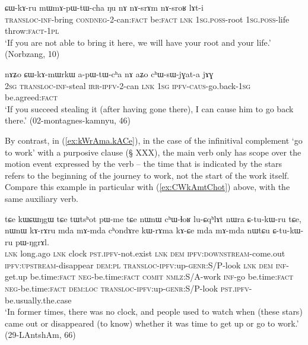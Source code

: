 \begin{exe}
\ex \label{ex:CWkAru}
\gll ɕɯ-kɤ-ru mɯ\redp{}mɤ-pɯ-tɯ-cha ŋu nɤ nɤ-srɤm nɤ-sroʁ lɤt-i \\
\textsc{transloc}-\textsc{inf}-bring \textsc{cond}\redp{}\textsc{neg}-2-can:\textsc{fact} be:\textsc{fact} \textsc{lnk} \textsc{1sg.poss}-root \textsc{1sg.poss}-life throw:\textsc{fact}-\textsc{1pl} \\ 
\glt `If you are not able to bring it here, we will have your root and your life.' (Norbzang, 10)
\end{exe}

\begin{exe}
\ex \label{ex:CWkAmWrkW}
\gll nɤʑo ɕɯ-kɤ-mɯrkɯ a-pɯ-tɯ-cʰa nɤ aʑo cʰɯ-sɯ-jɣat-a jɤɣ \\
\textsc{2sg} \textsc{transloc}-\textsc{inf}-steal \textsc{irr}-\textsc{ipfv}-2-can \textsc{lnk} \textsc{1sg} \textsc{ipfv}-\textsc{caus}-go.back-\textsc{1sg} be.agreed:\textsc{fact} \\
\glt `If you succeed stealing it (after having gone there), I can cause him to go back there.' (02-montagnes-kamnyu, 46)
\end{exe}

 
By contrast, in  (\ref{ex:kWrAma.kACe}), in the case of the infinitival complement  `go to work' with a purposive clause  (§ XXX), the main verb  only has scope over the motion event expressed by the verb  -- the time that is indicated by the stars refers to the beginning of the journey to work, not the start of the work itself. Compare this example in particular with (\ref{ex:CWkAmtChot}) above, with the same auxiliary verb.
 
 \begin{exe}
\ex \label{ex:kWrAma.kACe}
\gll  tɕe kɯɕɯŋgɯ tɕe tɯtsʰot pɯ-me tɕe  nɯnɯ cʰɯ-ɬoʁ lu-ɕqʰlɤt nɯra ɕ-tu-kɯ-ru tɕe, nɯnɯ kɤ-rɤru mda mɤ-mda cʰondɤre kɯ-rɤma kɤ-ɕe mda mɤ-mda nɯtɕu ɕ-tu-kɯ-ru pɯ-ŋgrɤl. \\
 \textsc{lnk} long.ago \textsc{lnk} clock \textsc{pst}.\textsc{ipfv}-not.exist \textsc{lnk} \textsc{dem} \textsc{ipfv}:\textsc{downstream}-come.out \textsc{ipfv}:\textsc{upstream}-disappear \textsc{dem}:\textsc{pl} \textsc{transloc}-\textsc{ipfv}:up-\textsc{genr}:S/P-look \textsc{lnk} \textsc{dem} \textsc{inf}-get.up be.time:\textsc{fact} \textsc{neg}-be.time:\textsc{fact} \textsc{comit} \textsc{nmlz}:S/A-work \textsc{inf}-go be.time:\textsc{fact} \textsc{neg}-be.time:\textsc{fact} \textsc{dem}:\textsc{loc} \textsc{transloc}-\textsc{ipfv}:up-\textsc{genr}:S/P-look \textsc{pst}.\textsc{ipfv}-be.usually.the.case  \\
 \glt  `In former times, there was no clock, and people used to watch when (these stars) came out or disappeared (to know) whether it was time to get up or go to work.' (29-LAntshAm, 66)
  \end{exe}
  
